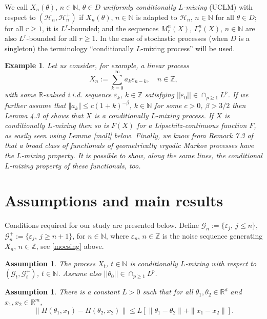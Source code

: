 \documentclass[a4paper]{article}
\newtheorem{example}[theorem]{Example}
\newtheorem{assumption}[theorem]{Assumption}
\begin{document}
We call $X_n(\theta)$, $n\in\mathbb{N}$, $\theta\in D$
\emph{uniformly {conditionally} $L$-mixing} (UCLM)
with respect to $(\mathcal{H}_n,\mathcal{H}_n^+)$ if
$X_n(\theta)$, $n\in\mathbb{N}$ is adapted to
$\mathcal{H}_n$, $n\in\mathbb{N}$
for all $\theta\in D$;
for all $r\geq 1$,
it is $L^r$-bounded;
and the sequences  $M^n_r(X)$, $\Gamma^n_r(X)$, $n\in\mathbb{N}$
are also $L^r$-bounded for all $r\geq 1$.
In the case of stochastic processes (when $D$ is a singleton)
the terminology ``conditionally $L$-mixing process'' will be used.

\begin{example}{\rm Let us consider, for example, a linear process
$$
X_n:=\sum_{k=0}^{\infty}a_k \varepsilon_{n-k},\quad n\in\mathbb{Z},
$$
with some $\mathbb{R}$-valued i.i.d. sequence $\varepsilon_k$, $k\in\mathbb{Z}$ satisfying $||\varepsilon_0||\in\cap_{p\geq 1} L^p$.
If we further assume that $\Vert a_k\Vert\leq c (1+k)^{-\beta}$, $k\in\mathbb{N}$
for some $c>0$, $\beta>3/2$
then Lemma 4.3 of \cite{4} shows that $X$ is a conditionally $L$-mixing process.
If $X$ is conditionally $L$-mixing then so is $F(X)$ for a Lipschitz-continuous
function $F$, as easily seen using Lemma \ref{mall} below. Finally, we know
from Remark 7.3 of \cite{balazs} that a broad class of functionals of geometrically ergodic Markov processes have the $L$-mixing property. It is possible
to show, along the same lines, the conditional $L$-mixing property of
these functionals, too.}
\end{example}

\section{Assumptions and main results}\label{assump}

Conditions required for our study are presented below.
Define $\mathcal{G}_n:=\{\varepsilon_j,\ j\leq n\}$,
$\mathcal{G}^+_n:=\{\varepsilon_j,\ j\geq n+1\}$, for $n\in\mathbb{N}$,
where $\varepsilon_n$, $n\in\mathbb{Z}$ is the noise sequence generating
$X_n$, $n\in\mathbb{Z}$, see \eqref{mocsing} above.



\begin{assumption}\label{lll} The process $X_t$, $t\in\mathbb{N}$ is
conditionally $L$-mixing with respect to $(\mathcal{G}_t,\mathcal{G}_t^+)$,
$t\in\mathbb{N}$. Assume also $||\theta_0||\in\cap_{p\geq 1}L^p$.
\end{assumption}

\begin{assumption}\label{lip}  There is a constant $L>0$ such that for all $\theta_1,\theta_2 \in \mathbb{R}^d$ and $x_1,x_2 \in \mathbb{R}^m$,
	$$
	\|H(\theta_1,x_1)-H(\theta_2,x_2)\|\leq L[\|\theta_1-\theta_2\|+\|x_1-x_2\|].
	$$
\end{assumption}
\end{document}
